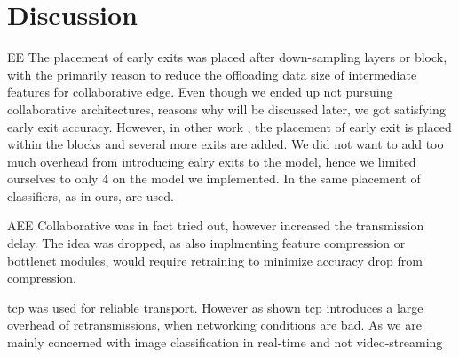\hypertarget{discussion}{%
\chapter{Discussion}\label{ch:discussion}}
\thispagestyle{fancy}


EE
The placement of early exits was placed after down-sampling layers or block, with the primarily reason to reduce the offloading data size of intermediate features for collaborative edge. Even though we ended up not pursuing collaborative architectures, reasons why will be discussed later, we got satisfying early exit accuracy. However, in other work \cite{huang_multi-scale_2017}, the placement of early exit is placed within the blocks and several more exits are added. We did not want to add too much overhead from introducing ealry exits to the model, hence we limited ourselves to only 4 on the model we implemented. In \cite{berestizshevsky_sacrificing_2019} the same placement of classifiers, as in ours, are used.

AEE
Collaborative was in fact tried out, however increased the transmission delay. The idea was dropped, as also implmenting feature compression or \gls{bottlenet} modules, would require retraining to minimize accuracy drop from compression.

\gls{tcp} was used for reliable transport. However as shown \gls{tcp} introduces a large overhead of retransmissions, when networking conditions are bad. As we are mainly concerned with image classification in real-time and not video-streaming 